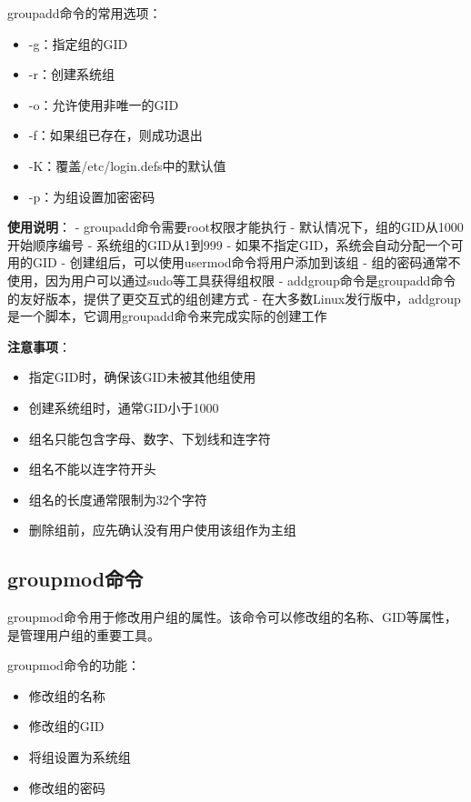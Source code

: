 \documentclass[12pt,UTF8]{ctexbook}
\begin{document}
groupadd命令的常用选项：
\begin{itemize}
    \item -g：指定组的GID
    \item -r：创建系统组
    \item -o：允许使用非唯一的GID
    \item -f：如果组已存在，则成功退出
    \item -K：覆盖/etc/login.defs中的默认值
    \item -p：为组设置加密密码
\end{itemize}

\textbf{使用说明}：
- groupadd命令需要root权限才能执行
- 默认情况下，组的GID从1000开始顺序编号
- 系统组的GID从1到999
- 如果不指定GID，系统会自动分配一个可用的GID
- 创建组后，可以使用usermod命令将用户添加到该组
- 组的密码通常不使用，因为用户可以通过sudo等工具获得组权限
- addgroup命令是groupadd命令的友好版本，提供了更交互式的组创建方式
- 在大多数Linux发行版中，addgroup是一个脚本，它调用groupadd命令来完成实际的创建工作

\textbf{注意事项}：
\begin{itemize}
    \item 指定GID时，确保该GID未被其他组使用
    \item 创建系统组时，通常GID小于1000
    \item 组名只能包含字母、数字、下划线和连字符
    \item 组名不能以连字符开头
    \item 组名的长度通常限制为32个字符
    \item 删除组前，应先确认没有用户使用该组作为主组
\end{itemize}

\subsection{groupmod命令}
groupmod命令用于修改用户组的属性。该命令可以修改组的名称、GID等属性，是管理用户组的重要工具。

groupmod命令的功能：
\begin{itemize}
    \item 修改组的名称
    \item 修改组的GID
    \item 将组设置为系统组
    \item 修改组的密码
\end{itemize}
\end{document}
